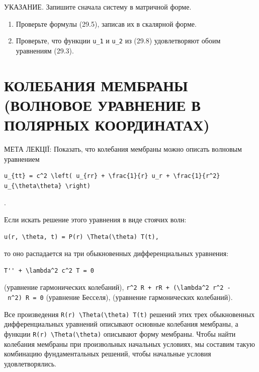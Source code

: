 \documentclass[
  ukrainian,
]{article}
\begin{document}
УКАЗАНИЕ. Запишите сначала систему в матричной форме.

\begin{enumerate}
\def\labelenumi{\arabic{enumi}.}
\setcounter{enumi}{3}
\item
  Проверьте формулы (29.5), записав их в скалярной форме.
\item
  Проверьте, что функции \texttt{u\_1} и \texttt{u\_2} из (29.8)
  удовлетворяют обоим уравнениям (29.3).
\end{enumerate}

\section{КОЛЕБАНИЯ МЕМБРАНЫ (ВОЛНОВОЕ УРАВНЕНИЕ В ПОЛЯРНЫХ
КООРДИНАТАХ)}\label{ux43aux43eux43bux435ux431ux430ux43dux438ux44f-ux43cux435ux43cux431ux440ux430ux43dux44b-ux432ux43eux43bux43dux43eux432ux43eux435-ux443ux440ux430ux432ux43dux435ux43dux438ux435-ux432-ux43fux43eux43bux44fux440ux43dux44bux445-ux43aux43eux43eux440ux434ux438ux43dux430ux442ux430ux445}

МЕТА ЛЕКЦІЇ: Показать, что колебания мембраны можно описать волновым
уравнением

\begin{verbatim}
u_{tt} = c^2 \left( u_{rr} + \frac{1}{r} u_r + \frac{1}{r^2} u_{\theta\theta} \right)
\end{verbatim}

.

Если искать решение этого уравнения в виде стоячих волн:

\begin{verbatim}
u(r, \theta, t) = P(r) \Theta(\theta) T(t),
\end{verbatim}

то оно распадается на три обыкновенных дифференциальных уравнения:

\begin{verbatim}
T'' + \lambda^2 c^2 T = 0
\end{verbatim}

(уравнение гармонических колебаний),
\texttt{r\^{}2\ R\textquotesingle{}\textquotesingle{}\ +\ rR\textquotesingle{}\ +\ (\textbackslash{}lambda\^{}2\ r\^{}2\ -\ n\^{}2)\ R\ =\ 0}
(уравнение Бесселя), (уравнение гармонических колебаний).

Все произведения
\texttt{R(r)\ \textbackslash{}Theta(\textbackslash{}theta)\ T(t)}
решений этих трех обыкновенных дифференциальных уравнений описывают
основные колебания мембраны, а функции
\texttt{R(r)\ \textbackslash{}Theta(\textbackslash{}theta)} описывают
форму мембраны. Чтобы найти колебания мембраны при произвольных
начальных условиях, мы составим такую комбинацию фундаментальных
решений, чтобы начальные условия удовлетворялись.
\end{document}
